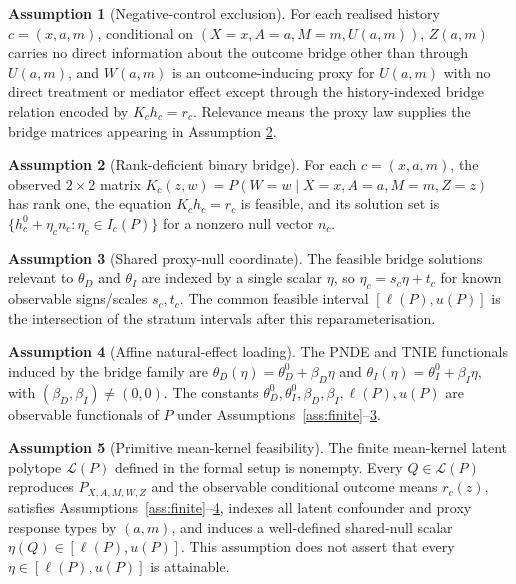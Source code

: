 \documentclass[11pt]{article}
\theoremstyle{definition}
\newtheorem{assumption}{Assumption}
\theoremstyle{plain}
\theoremstyle{remark}
\begin{document}
\begin{assumption}[Negative-control exclusion]\label{ass:negative-control}
For each realised history \(c=(x,a,m)\), conditional on
\((X=x,A=a,M=m,U(a,m))\), \(Z(a,m)\) carries no direct information about the
outcome bridge other than through \(U(a,m)\), and \(W(a,m)\) is an
outcome-inducing proxy for \(U(a,m)\) with no direct treatment or mediator
effect except through the history-indexed bridge relation encoded by
\(K_ch_c=r_c\).  Relevance means the proxy law supplies the bridge matrices
appearing in Assumption \ref{ass:rank-def}.
\end{assumption}

\begin{assumption}[Rank-deficient binary bridge]\label{ass:rank-def}
For each \(c=(x,a,m)\), the observed \(2\times2\) matrix
\(K_c(z,w)=P(W=w\mid X=x,A=a,M=m,Z=z)\) has rank one, the equation
\(K_ch_c=r_c\) is feasible, and its solution set is
\(\{h_c^0+\eta_c n_c:\eta_c\in I_c(P)\}\) for a nonzero null vector \(n_c\).
\end{assumption}

\begin{assumption}[Shared proxy-null coordinate]\label{ass:shared-null}
The feasible bridge solutions relevant to \(\theta_D\) and \(\theta_I\) are
indexed by a single scalar \(\eta\), so \(\eta_c=s_c\eta+t_c\) for known
observable signs/scales \(s_c,t_c\).  The common feasible interval
\([\ell(P),u(P)]\) is the intersection of the stratum intervals after this
reparameterisation.
\end{assumption}

\begin{assumption}[Affine natural-effect loading]\label{ass:affine-loading}
The PNDE and TNIE functionals induced by the bridge family are
\(\theta_D(\eta)=\theta_D^0+\beta_D\eta\) and
\(\theta_I(\eta)=\theta_I^0+\beta_I\eta\), with
\((\beta_D,\beta_I)\neq(0,0)\).  The constants
\(\theta_D^0,\theta_I^0,\beta_D,\beta_I,\ell(P),u(P)\) are observable
functionals of \(P\) under Assumptions~\ref{ass:finite}--\ref{ass:shared-null}.
\end{assumption}

\begin{assumption}[Primitive mean-kernel feasibility]\label{ass:latent-polytope}
The finite mean-kernel latent polytope \(\mathcal L(P)\) defined in the formal
setup is nonempty.  Every \(Q\in\mathcal L(P)\) reproduces
\(P_{X,A,M,W,Z}\) and the observable conditional outcome means \(r_c(z)\),
satisfies Assumptions~\ref{ass:finite}--\ref{ass:affine-loading}, indexes all
latent confounder and proxy response types by \((a,m)\), and induces a
well-defined shared-null scalar \(\eta(Q)\in[\ell(P),u(P)]\).  This assumption
does not assert that every \(\eta\in[\ell(P),u(P)]\) is attainable.
\end{assumption}
\end{document}
